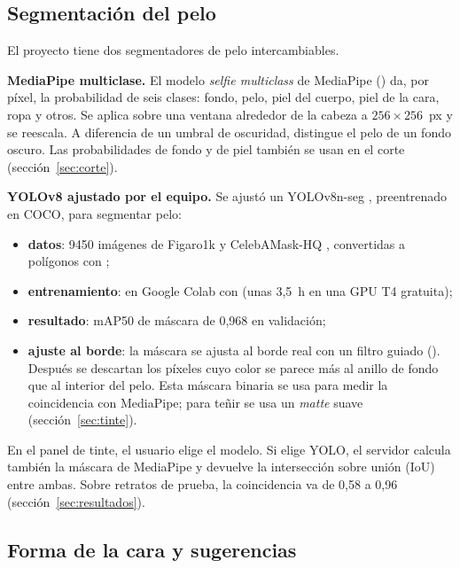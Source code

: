 \subsection{Segmentación del pelo}
\label{sec:segmentacion}

El proyecto tiene dos segmentadores de pelo intercambiables.

\textbf{MediaPipe multiclase.} El modelo \emph{selfie multiclass} de MediaPipe () da, por píxel, la probabilidad de seis clases: fondo, pelo, piel del cuerpo, piel de la cara, ropa y otros. Se aplica sobre una ventana alrededor de la cabeza a $256\times256$~px y se reescala. A diferencia de un umbral de oscuridad, distingue el pelo de un fondo oscuro. Las probabilidades de fondo y de piel también se usan en el corte (sección~\ref{sec:corte}).

\textbf{YOLOv8 ajustado por el equipo.} Se ajustó un YOLOv8n-seg \cite{jocher2023}, preentrenado en COCO, para segmentar pelo:
\begin{itemize}
  \item \textbf{datos}: 9450 imágenes de Figaro1k \cite{svanera2016} y CelebAMask-HQ \cite{lee2020}, convertidas a polígonos con ;
  \item \textbf{entrenamiento}: en Google Colab con  (unas 3{,}5~h en una GPU T4 gratuita);
  \item \textbf{resultado}: mAP50 de máscara de 0{,}968 en validación;
  \item \textbf{ajuste al borde}: la máscara se ajusta al borde real con un filtro guiado \cite{he2013} (). Después se descartan los píxeles cuyo color se parece más al anillo de fondo que al interior del pelo. Esta máscara binaria se usa para medir la coincidencia con MediaPipe; para teñir se usa un \emph{matte} suave (sección~\ref{sec:tinte}).
\end{itemize}

En el panel de tinte, el usuario elige el modelo. Si elige YOLO, el servidor calcula también la máscara de MediaPipe y devuelve la intersección sobre unión (IoU) entre ambas. Sobre retratos de prueba, la coincidencia va de 0{,}58 a 0{,}96 (sección~\ref{sec:resultados}).

\subsection{Forma de la cara y sugerencias}
\label{sec:forma}

